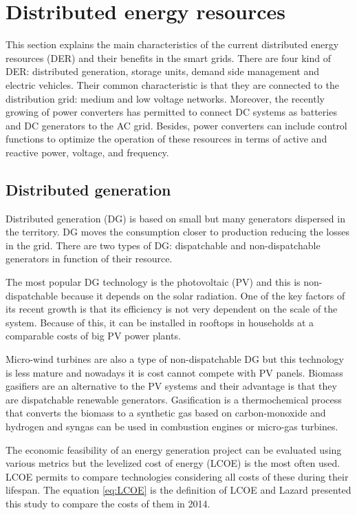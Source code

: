 \documentclass[a4paper,11pt,twoside,openright]{report}
\begin{document}
\section{Distributed energy resources}
\label{sec:DER}
This section explains the main characteristics of the current distributed energy resources (DER) and their benefits in the smart grids.
There are four kind of DER: distributed generation, storage units, demand side management and electric vehicles. Their common characteristic is that they are connected to the distribution grid: medium and low voltage networks.
Moreover, the recently growing of power converters has permitted to connect DC systems as batteries and DC generators to the AC grid. Besides, power converters can include control functions to optimize the operation of these resources in terms of active and reactive power, voltage, and frequency.

\subsection{Distributed generation}

Distributed generation (DG) is based on small but many generators dispersed in the territory. DG moves the consumption closer to production reducing the losses in the grid. 
There are two types of DG: dispatchable and non-dispatchable generators in function of their resource.

The most popular DG technology is the photovoltaic (PV) and this is non-dispatchable because it depends on the solar radiation. One of the key factors of its recent growth is that its efficiency is not very dependent on the scale of the system. Because of this, it can be installed in rooftops in households at a comparable costs of big PV power plants.

Micro-wind turbines are also a type of non-dispatchable DG but this technology is less mature and nowadays it is cost cannot compete with PV panels. Biomass gasifiers are an alternative to the PV systems and their advantage is that they are dispatchable renewable generators. Gasification is a thermochemical process that converts the biomass to a synthetic gas based on carbon-monoxide and hydrogen and syngas can be used in combustion engines or micro-gas turbines.

The economic feasibility of an energy generation project can be evaluated using various metrics but the levelized cost of energy (LCOE) is the most often used. LCOE permits to compare technologies considering all costs of these during their lifespan. The equation \ref{eq:LCOE} is the definition of LCOE and Lazard \cite{Lazard2014} presented this study to compare the costs of them in 2014.
\end{document}
